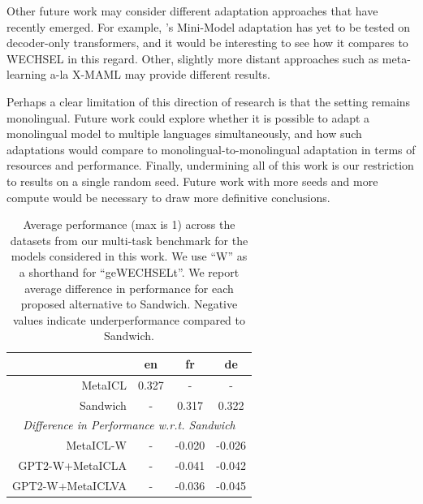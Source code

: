 \documentclass[11pt]{article}
\begin{document}
Other future work may consider different adaptation approaches that have recently emerged. For
example, \citet{marchisio_mini-model_2022}'s Mini-Model adaptation has yet to be tested on
decoder-only transformers, and it would be interesting to see how it compares to WECHSEL in this
regard. Other, slightly more distant approaches such as meta-learning a-la X-MAML
\citep{nooralahzadeh_zero-shot_2020} may provide different results.

Perhaps a clear limitation of this direction of research is that the setting remains monolingual.
Future work could explore whether it is possible to adapt a monolingual model to multiple languages
simultaneously, and how such adaptations would compare to monolingual-to-monolingual adaptation in
terms of resources and performance. Finally, undermining all of this work is our restriction to
results on a single random seed. Future work with more seeds and more compute would be necessary to
draw more definitive conclusions.

\begin{table}[ht]
	\centering
	\caption{Average performance (max is 1) across the datasets from our multi-task benchmark for the
		models considered in this work. We use ``W'' as a shorthand for ``geWECHSELt''. We report average
		difference in performance for each proposed alternative to Sandwich. Negative values indicate
		underperformance compared to Sandwich.}
	\label{tab:results-summary}
	\begin{tabular}{@{}rccc@{}}
		\toprule
		\multicolumn{1}{c}{} & en    & fr     & de                             \\ \midrule
		MetaICL              & 0.327 & -      & -                              \\
		Sandwich             & -     & 0.317  & 0.322                          \\ \midrule
		\multicolumn{4}{c}{\textit{Difference in Performance w.r.t. Sandwich}} \\
		MetaICL-W            & -     & -0.020 & -0.026                         \\
		GPT2-W+MetaICLA      & -     & -0.041 & -0.042                         \\
		GPT2-W+MetaICLVA     & -     & -0.036 & -0.045                         \\ \bottomrule
	\end{tabular}
\end{table}
\end{document}
